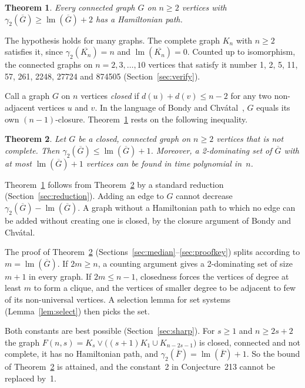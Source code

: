 \documentclass[11pt,a4paper]{article}
\newtheorem{theorem}{Theorem}
\theoremstyle{remark}
\newcommand{\lm}{\operatorname{lm}}
\newcommand{\Gc}{\overline{G}}
\newcommand{\Fc}{\overline{F}}
\begin{document}
\begin{theorem}\label{thm:main}
Every connected graph $G$ on $n\ge 2$ vertices with $\gamma_2(\Gc)\ge\lm(\Gc)+2$ has a
Hamiltonian path.
\end{theorem}

The hypothesis holds for many graphs. The complete graph $K_n$ with $n\ge 2$ satisfies it, since
$\gamma_2(\overline{K_n})=n$ and $\lm(\overline{K_n})=0$. Counted up to isomorphism, the
connected graphs on $n=2,3,\dots,10$ vertices that satisfy it number 1, 2, 5, 11, 57, 261, 2248,
27724 and 874505 (Section~\ref{sec:verify}).

Call a graph $G$ on $n$ vertices \emph{closed} if $d(u)+d(v)\le n-2$ for any two non-adjacent
vertices $u$ and $v$. In the language of Bondy and Chv\'atal~\cite{bc}, $G$ equals its own
$(n-1)$-closure. Theorem~\ref{thm:main} rests on the following inequality.

\begin{theorem}\label{thm:key}
Let $G$ be a closed, connected graph on $n\ge 2$ vertices that is not complete. Then
$\gamma_2(\Gc)\le\lm(\Gc)+1$. Moreover, a 2-dominating set of $\Gc$ with at most $\lm(\Gc)+1$
vertices can be found in time polynomial in~$n$.
\end{theorem}

Theorem~\ref{thm:main} follows from Theorem~\ref{thm:key} by a standard reduction
(Section~\ref{sec:reduction}). Adding an edge to $G$ cannot decrease $\gamma_2(\Gc)-\lm(\Gc)$.
A graph without a Hamiltonian path to which no edge can be added without creating one is closed,
by the closure argument of Bondy and Chv\'atal.

The proof of Theorem~\ref{thm:key} (Sections~\ref{sec:median}--\ref{sec:proofkey}) splits
according to $m=\lm(\Gc)$. If $2m\ge n$, a counting argument gives a 2-dominating set of size
$m+1$ in every graph. If $2m\le n-1$, closedness forces the vertices of degree at least $m$ to
form a clique, and the vertices of smaller degree to be adjacent to few of its non-universal
vertices. A selection lemma for set systems (Lemma~\ref{lem:select}) then picks the set.

Both constants are best possible (Section~\ref{sec:sharp}). For $s\ge 1$ and $n\ge 2s+2$ the
graph $F(n,s)=K_s\vee\bigl((s+1)K_1\cup K_{n-2s-1}\bigr)$ is closed, connected and not complete,
it has no Hamiltonian path, and $\gamma_2(\Fc)=\lm(\Fc)+1$. So the bound of
Theorem~\ref{thm:key} is attained, and the constant~2 in Conjecture~213 cannot be replaced
by~1.
\end{document}
